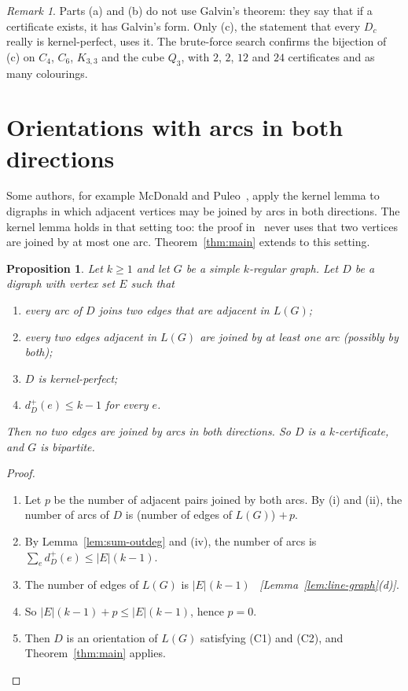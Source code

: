 \documentclass[11pt]{article}
\theoremstyle{plain}
\newtheorem{proposition}[theorem]{Proposition}
\theoremstyle{definition}
\theoremstyle{remark}
\newtheorem{remark}[theorem]{Remark}
\newcommand{\LG}{L(G)}
\newcommand{\dout}{d^{+}}
\newcommand{\why}[1]{\unskip\ \textit{[#1]}}
\newenvironment{steps}{\begin{enumerate}[label=(\arabic*),leftmargin=2.2em,itemsep=0.35em]}{\end{enumerate}}
\begin{document}
\begin{remark}
Parts (a) and (b) do not use Galvin's theorem: they say that if a certificate exists, it has
Galvin's form. Only (c), the statement that every $D_c$ really is kernel-perfect, uses it. The
brute-force search confirms the bijection of (c) on $C_4$, $C_6$, $K_{3,3}$ and the cube $Q_3$,
with $2$, $2$, $12$ and $24$ certificates and as many colourings.
\end{remark}

\section{Orientations with arcs in both directions}\label{sec:twoway}

Some authors, for example McDonald and Puleo~\cite{mp}, apply the kernel lemma to digraphs in
which adjacent vertices may be joined by arcs in both directions. The kernel lemma holds in that
setting too: the proof in~\cite[Chapter~33]{book} never uses that two vertices are joined by at
most one arc. Theorem~\ref{thm:main} extends to this setting.

\begin{proposition}\label{prop:twoway}
Let $k\ge 1$ and let $G$ be a simple $k$-regular graph. Let $D$ be a digraph with vertex set $E$
such that
\begin{enumerate}[label=(\roman*)]
  \item every arc of $D$ joins two edges that are adjacent in $\LG$;
  \item every two edges adjacent in $\LG$ are joined by at least one arc (possibly by both);
  \item $D$ is kernel-perfect;
  \item $\dout_D(e)\le k-1$ for every $e$.
\end{enumerate}
Then no two edges are joined by arcs in both directions. So $D$ is a $k$-certificate, and $G$ is
bipartite.
\end{proposition}

\begin{proof}
\begin{steps}
  \item Let $p$ be the number of adjacent pairs joined by both arcs. By (i) and (ii), the number
    of arcs of $D$ is (number of edges of $\LG$) $+\,p$.
  \item By Lemma~\ref{lem:sum-outdeg} and (iv), the number of arcs is
    $\sum_e\dout_D(e)\le|E|(k-1)$.
  \item The number of edges of $\LG$ is $|E|(k-1)$ \why{Lemma~\ref{lem:line-graph}(d)}.
  \item So $|E|(k-1)+p\le|E|(k-1)$, hence $p=0$.
  \item Then $D$ is an orientation of $\LG$ satisfying (C1) and (C2), and
    Theorem~\ref{thm:main} applies. \qedhere
\end{steps}
\end{proof}
\end{document}
